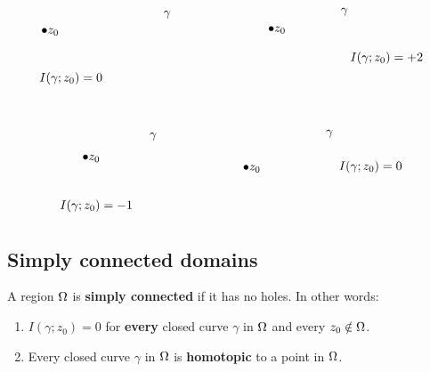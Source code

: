 \documentclass[12pt]{article}
\begin{document}
\[\begin{tikzpicture}[x=0.75pt,y=0.75pt,yscale=-1,xscale=1]
    \draw (32,41) node [anchor=north west][inner sep=0.75pt]   [align=left] {$\displaystyle \bullet z_{0}$};
    \draw (163,22.4) node [anchor=north west][inner sep=0.75pt]    {$\gamma $};
    \draw (30,88.4) node [anchor=north west][inner sep=0.75pt]    {$I( \gamma ;z_{0}) =0$};
    \draw (275,39) node [anchor=north west][inner sep=0.75pt]   [align=left] {$\displaystyle \bullet z_{0}$};
    \draw (353,19.4) node [anchor=north west][inner sep=0.75pt]    {$\gamma $};
    \draw (363,66.4) node [anchor=north west][inner sep=0.75pt]    {$I( \gamma ;z_{0}) =+2$};
    \draw (76,177) node [anchor=north west][inner sep=0.75pt]   [align=left] {$\displaystyle \bullet z_{0}$};
    \draw (148,153.4) node [anchor=north west][inner sep=0.75pt]    {$\gamma $};
    \draw (52,225.4) node [anchor=north west][inner sep=0.75pt]    {$I( \gamma ;z_{0}) =-1$};
    \draw (248,188) node [anchor=north west][inner sep=0.75pt]   [align=left] {$\displaystyle \bullet z_{0}$};
    \draw (337,150.4) node [anchor=north west][inner sep=0.75pt]    {$\gamma $};
    \draw (351,183.4) node [anchor=north west][inner sep=0.75pt]    {$I( \gamma ;z_{0}) =0$};
    
    
    \end{tikzpicture}
    \]

\subsection{Simply connected domains}
 A region $\Omega$ is \textbf{simply connected} if it has no holes. In other words: \begin{enumerate}[label=(\alph*)]
    \item $I(\gamma;z_0)=0$ for \textbf{every} closed curve $\gamma$ in $\Omega$ and every $z_0\notin \Omega$. 
    \item Every closed curve $\gamma$ in $\Omega$ is \textbf{homotopic} to a point in $\Omega$.
\end{enumerate}
\end{document}
